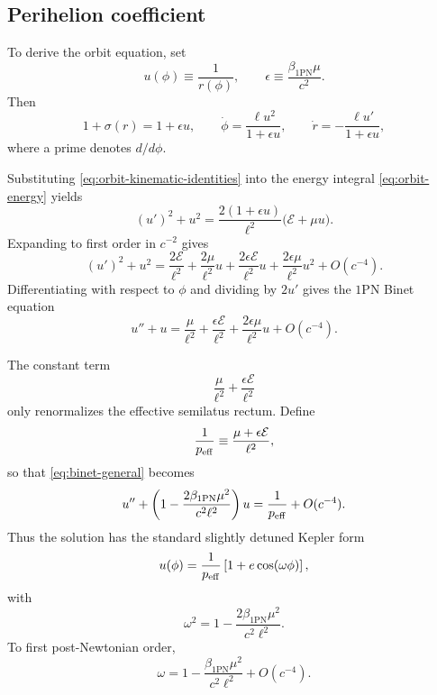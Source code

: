 \documentclass[11pt]{article}
\newcommand{\betaPN}{\beta_{\mathrm{1PN}}}
\begin{document}
\subsection{Perihelion coefficient}
\label{sec:perihelion}

To derive the orbit equation, set
\begin{equation}
u(\phi)\equiv \frac{1}{r(\phi)},
\qquad
\epsilon \equiv \frac{\betaPN\mu}{c^2}.
\label{eq:u-and-epsilon}
\end{equation}
Then
\begin{equation}
1+\sigma(r)=1+\epsilon u,
\qquad
\dot\phi=\frac{\ell u^2}{1+\epsilon u},
\qquad
\dot r=-\frac{\ell u'}{1+\epsilon u},
\label{eq:orbit-kinematic-identities}
\end{equation}
where a prime denotes \(d/d\phi\).

Substituting \eqref{eq:orbit-kinematic-identities} into the energy integral
\eqref{eq:orbit-energy} yields
\begin{equation}
(u')^2+u^2
=
\frac{2(1+\epsilon u)}{\ell^2}\bigl(\mathcal E+\mu u\bigr).
\label{eq:first-integral-u}
\end{equation}
Expanding to first order in \(c^{-2}\) gives
\begin{equation}
(u')^2+u^2
=
\frac{2\mathcal E}{\ell^2}
+\frac{2\mu}{\ell^2}u
+\frac{2\epsilon\mathcal E}{\ell^2}u
+\frac{2\epsilon\mu}{\ell^2}u^2
+O(c^{-4}).
\label{eq:first-integral-u-expanded}
\end{equation}
Differentiating with respect to \(\phi\) and dividing by \(2u'\) gives the \(1\)PN Binet
equation
\begin{equation}
u''+u
=
\frac{\mu}{\ell^2}
+\frac{\epsilon\mathcal E}{\ell^2}
+\frac{2\epsilon\mu}{\ell^2}u
+O(c^{-4}).
\label{eq:binet-general}
\end{equation}

The constant term
\begin{equation}
\frac{\mu}{\ell^2}+\frac{\epsilon\mathcal E}{\ell^2}
\label{eq:constant-shift}
\end{equation}
only renormalizes the effective semilatus rectum. Define
\begin{equation}
\frac{1}{p_{\rm eff}}
\equiv
\frac{\mu+\epsilon\mathcal E}{\ell^2},
\label{eq:p-eff-def}
\end{equation}
so that \eqref{eq:binet-general} becomes
\begin{equation}
u''+
\left(
1-\frac{2\betaPN\mu^2}{c^2\ell^2}
\right)u
=
\frac{1}{p_{\rm eff}}
+O(c^{-4}).
\label{eq:binet-frequency-shift}
\end{equation}
Thus the solution has the standard slightly detuned Kepler form
\begin{equation}
u(\phi)
=
\frac{1}{p_{\rm eff}}
\left[
1+e\cos(\omega\phi)
\right],
\label{eq:detuned-kepler}
\end{equation}
with
\begin{equation}
\omega^2
=
1-\frac{2\betaPN\mu^2}{c^2\ell^2}.
\label{eq:omega-squared}
\end{equation}
To first post-Newtonian order,
\begin{equation}
\omega
=
1-\frac{\betaPN\mu^2}{c^2\ell^2}
+O(c^{-4}).
\label{eq:omega-expanded}
\end{equation}
\end{document}
